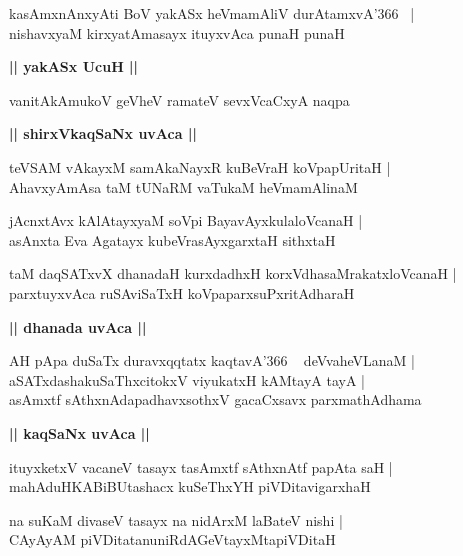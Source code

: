 \documentclass[twoside,12pt,openright]{book}
\newcounter{shloka}[chapter]
\def\uvaca#1{\centerline{{\large\textbf{#1}}}}
\begin{document}
\begin{shloka}%
kasAmxnAnxyAti BoV yakASx heVmamAliV durAtamxvA\char'366 ~|\\
nishavxyaM kirxyatAmasayx ituyxvAca punaH punaH 
\end{shloka}

\uvaca{|| yakASx UcuH ||}

\begin{shloka}%
vanitAkAmukoV geVheV ramateV sevxVcaCxyA naqpa 
\end{shloka}

\uvaca{|| shirxVkaqSaNx uvAca ||}

\begin{shloka}%
teVSAM vAkayxM samAkaNayxR kuBeVraH koVpapUritaH |\\
AhavxyAmAsa taM tUNaRM vaTukaM heVmamAlinaM
\end{shloka}

\begin{shloka}%
jAcnxtAvx kAlAtayxyaM soVpi BayavAyxkulaloVcanaH |\\
asAnxta Eva Agatayx kubeVrasAyxgarxtaH sithxtaH
\end{shloka}

\begin{shloka}%
taM daqSATxvX dhanadaH kurxdadhxH korxVdhasaMrakatxloVcanaH |\\
parxtuyxvAca ruSAviSaTxH koVpaparxsuPxritAdharaH
\end{shloka}

\uvaca{|| dhanada uvAca ||}

\begin{shloka}%
AH pApa duSaTx duravxqqtatx kaqtavA\char'366 ~ deVvaheVLanaM |\\
aSATxdashakuSaThxcitokxV viyukatxH kAMtayA tayA |\\
asAmxtf sAthxnAdapadhavxsothxV gacaCxsavx parxmathAdhama
\end{shloka}

\uvaca{|| kaqSaNx uvAca ||}

\begin{shloka}%
ituyxketxV vacaneV tasayx tasAmxtf sAthxnAtf papAta saH |\\
mahAduHKABiBUtashacx kuSeThxYH piVDitavigarxhaH
\end{shloka}

\begin{shloka}%
na suKaM divaseV tasayx na nidArxM laBateV nishi |\\
CAyAyAM piVDitatanuniRdAGeVtayxMtapiVDitaH
\end{shloka}
\end{document}
